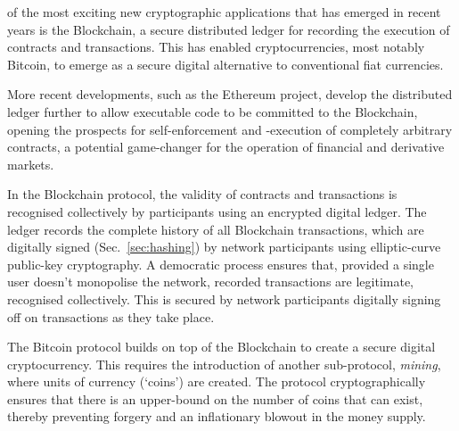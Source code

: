  of the most exciting new cryptographic applications that has emerged in recent years is the Blockchain, a secure distributed ledger for recording the execution of contracts and transactions. This has enabled cryptocurrencies, most notably Bitcoin, to emerge as a secure digital alternative to conventional fiat currencies.

More recent developments, such as the Ethereum project, develop the distributed ledger further to allow executable code to be committed to the Blockchain, opening the prospects for self-enforcement and -execution of completely arbitrary contracts, a potential game-changer for the operation of financial and derivative markets.

In the Blockchain protocol, the validity of contracts and transactions is recognised collectively by participants using an encrypted digital ledger. The ledger records the complete history of all Blockchain transactions, which are digitally signed (Sec.~\ref{sec:hashing}) by network participants using elliptic-curve public-key cryptography. A democratic process ensures that, provided a single user doesn't monopolise the network, recorded transactions are legitimate, recognised collectively. This is secured by network participants digitally signing off on transactions as they take place.

The Bitcoin protocol builds on top of the Blockchain to create a secure digital cryptocurrency. This requires the introduction of another sub-protocol, \textit{mining}, where units of currency (`coins') are created. The protocol cryptographically ensures that there is an upper-bound on the number of coins that can exist, thereby preventing forgery and an inflationary blowout in the money supply.

